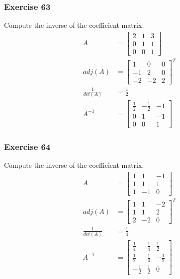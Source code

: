\documentclass{math}
\begin{document}
\subsubsection*{Exercise 63}
Compute the inverse of the coefficient matrix.
\begin{align*}
  A &= \begin{bmatrix}
    2 & 1 & 3 \\
    0 & 1 & 1 \\
    0 & 0 & 1
  \end{bmatrix} \\
  adj(A) &= \begin{bmatrix}
    1 & 0 & 0 \\
    -1 & 2 & 0 \\
    -2 & -2 & 2
  \end{bmatrix}^T \\
  \frac{1}{det(A)} &= \frac{1}{2} \\
  A^{-1} &= \begin{bmatrix}
    \frac{1}{2} & -\frac{1}{2} & -1 \\
    0 & 1 & -1 \\
    0 & 0 & 1
  \end{bmatrix}
\end{align*}

\subsubsection*{Exercise 64}
Compute the inverse of the coefficient matrix.
\begin{align*}
  A &= \begin{bmatrix}
    1 & 1 & -1 \\
    1 & 1 & 1 \\
    1 & -1 & 0
  \end{bmatrix} \\
  adj(A) &= \begin{bmatrix}
    1 & 1 & -2 \\
    1 & 1 & 2 \\
    2 & -2 & 0
  \end{bmatrix}^T \\
  \frac{1}{det(A)} &= \frac{1}{4} \\
  A^{-1} &= \begin{bmatrix}
    \frac{1}{4} & \frac{1}{4} & \frac{1}{2} \\[0.5em]
    \frac{1}{2} & \frac{1}{4} & -\frac{1}{2} \\[0.5em]
    -\frac{1}{2} & \frac{1}{2} & 0
  \end{bmatrix}
\end{align*}
\end{document}
